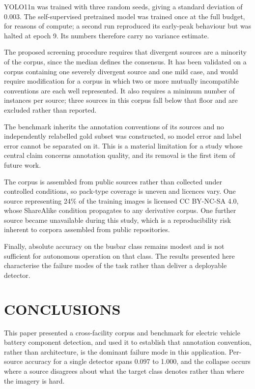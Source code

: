 YOLO11n was trained with three random seeds, giving a standard deviation of 0.003. The
self-supervised pretrained model was trained once at the full budget, for reasons of
compute; a second run reproduced its early-peak behaviour but was halted at epoch 9.
Its numbers therefore carry no variance estimate.

The proposed screening procedure requires that divergent sources are a minority of the
corpus, since the median defines the consensus. It has been validated on a corpus
containing one severely divergent source and one mild case, and would require
modification for a corpus in which two or more mutually incompatible conventions are
each well represented. It also requires a minimum number of instances per source; three
sources in this corpus fall below that floor and are excluded rather than reported.

The benchmark inherits the annotation conventions of its sources and no independently
relabelled gold subset was constructed, so model error and label error cannot be
separated on it. This is a material limitation for a study whose central claim concerns
annotation quality, and its removal is the first item of future work.

The corpus is assembled from public sources rather than collected under controlled
conditions, so pack-type coverage is uneven and licences vary. One source representing
24\% of the training images is licensed CC BY-NC-SA 4.0, whose ShareAlike condition
propagates to any derivative corpus. One further source became unavailable during this
study, which is a reproducibility risk inherent to corpora assembled from public
repositories.

Finally, absolute accuracy on the busbar class remains modest and is not sufficient for
autonomous operation on that class. The results presented here characterise the failure
modes of the task rather than deliver a deployable detector.

\section{\uppercase{Conclusions}}

\noindent This paper presented a cross-facility corpus and benchmark for electric
vehicle battery component detection, and used it to establish that annotation
convention, rather than architecture, is the dominant failure mode in this
application. Per-source accuracy for a single detector spans 0.097 to 1.000, and the
collapse occurs where a source disagrees about what the target class denotes rather
than where the imagery is hard.

